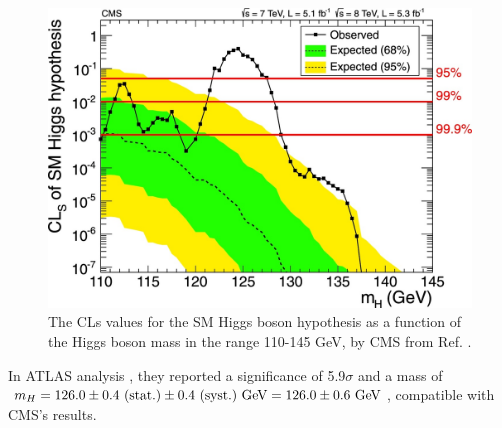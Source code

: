 \begin{figure}[!ht]
    \vspace*{-0.0cm}
    \centering
    \setlength{\mylength}{\textwidth}
    \includegraphics[width=0.60\mylength]{resources/CMS_Higgs_CLs.jpg}
    \vspace*{-0.0cm}
    \caption{The CLs values for the SM Higgs boson hypothesis as a function of the Higgs boson mass in the range 110-145 GeV, by CMS from Ref. \cite{CMS:2012qbp}.}
    \label{fig:CMS_Higgs_CLs}
    \vspace*{-0.3cm}
\end{figure}

In ATLAS analysis \cite{ATLAS:2012yve}, they reported a significance of 5.9$\sigma$ and a mass of $m_H=126.0\pm0.4\text{ (stat.)}\pm0.4\text{ (syst.)}\ \text{GeV} = 126.0\pm0.6\ \text{GeV}$, compatible with CMS's results.